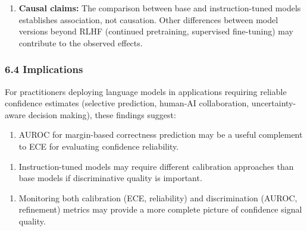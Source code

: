 \begin{enumerate}
\item \textbf{Causal claims:} The comparison between base and instruction-tuned models establishes association, not causation. Other differences between model versions beyond RLHF (continued pretraining, supervised fine-tuning) may contribute to the observed effects.
\end{enumerate}

\subsubsection{6.4 Implications}

For practitioners deploying language models in applications requiring reliable confidence estimates (selective prediction, human-AI collaboration, uncertainty-aware decision making), these findings suggest:

\begin{enumerate}
\item AUROC for margin-based correctness prediction may be a useful complement to ECE for evaluating confidence reliability.
\end{enumerate}

\begin{enumerate}
\item Instruction-tuned models may require different calibration approaches than base models if discriminative quality is important.
\end{enumerate}

\begin{enumerate}
\item Monitoring both calibration (ECE, reliability) and discrimination (AUROC, refinement) metrics may provide a more complete picture of confidence signal quality.
\end{enumerate}
